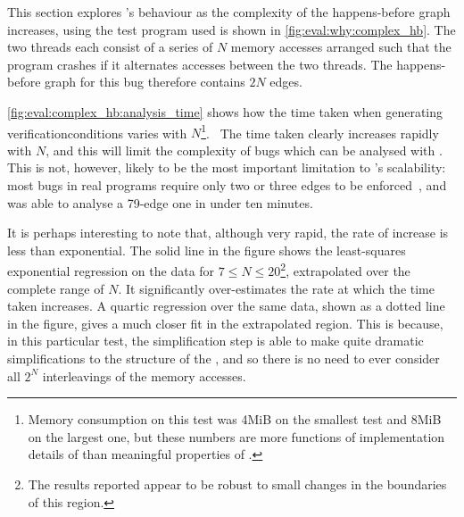 \noindent
This section explores {\technique}'s behaviour as the complexity of
the happens-before graph increases, using the test program used is
shown in \autoref{fig:eval:why:complex_hb}.  The two threads each
consist of a series of $N$ memory accesses arranged such that the
program crashes if it alternates accesses between the two threads.
The happens-before graph for this bug therefore contains $2N$ edges.

\begin{sanefig}
  \caption{Time taken to analyse the $_N$ test,
    for varying values of $N$.  Note log scale.  Each abscissae was
    sampled eleven times, discarding the first, in random order.
    Crosses and bars give the mean and 90\% confidence interval of the
    mean, calculated using the central limit theorem.  The solid line
    shows a regression onto ${\alpha}e^{{\beta}N} + \gamma$ over $7
    \leq N \leq 20$ extrapolated to the full range of $N$; the dashed
    one shows a quartic regression over the same data.  Grey regions
    give 90\% confidence intervals for the regression lines, computed
    using a 1,000 replicate bootstrap.  Note that the regressions
    minimise the sum of squares loss, but are plotted on a logarithmic
    scale.}
  \label{fig:eval:complex_hb:analysis_time}
\end{sanefig}

\autoref{fig:eval:complex_hb:analysis_time} shows how the time taken
when generating \glspl{verificationcondition} varies with
$N$\footnote{Memory consumption on this test was 4MiB on the smallest
  test and 8MiB on the largest one, but these numbers are more
  functions of implementation details of {\implementation} than
  meaningful properties of {\technique}.}\!\!\!.  ~The time taken clearly
increases rapidly with $N$, and this will limit the complexity of bugs
which can be analysed with {\technique}.  This is not, however, likely
to be the most important limitation to {\technique}'s scalability:
most bugs in real programs require only two or three edges to be
enforced~\cite{Musuvathi2008}, and {\technique} was able to analyse a
79-edge one in under ten minutes.

 It is perhaps interesting to
note that, although very rapid, the rate of increase is less than
exponential.  The solid line in the figure shows the least-squares
exponential regression on the data for $7 \leq N \leq 20$\footnote{The
  results reported appear to be robust to small changes in the
  boundaries of this region.}, extrapolated over the complete range of
$N$.  It significantly over-estimates the rate at which the time taken
increases.  A quartic regression over the same data, shown as a dotted
line in the figure, gives a much closer fit in the extrapolated
region.  This is because, in this particular test, the {\StateMachine}
simplification step is able to make quite dramatic simplifications to
the structure of the {\StateMachines}, and so there is no need to ever
consider all $2^N$ interleavings of the memory accesses.

